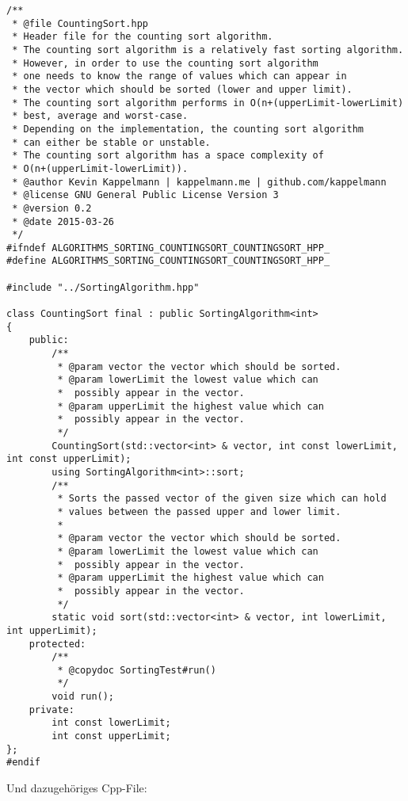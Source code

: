 \documentclass[12pt]{article}
\begin{document}
\begin{lstlisting}
/**
 * @file CountingSort.hpp
 * Header file for the counting sort algorithm.
 * The counting sort algorithm is a relatively fast sorting algorithm.
 * However, in order to use the counting sort algorithm
 * one needs to know the range of values which can appear in 
 * the vector which should be sorted (lower and upper limit).
 * The counting sort algorithm performs in O(n+(upperLimit-lowerLimit) 
 * best, average and worst-case.
 * Depending on the implementation, the counting sort algorithm 
 * can either be stable or unstable.
 * The counting sort algorithm has a space complexity of 
 * O(n+(upperLimit-lowerLimit)).
 * @author Kevin Kappelmann | kappelmann.me | github.com/kappelmann
 * @license GNU General Public License Version 3
 * @version 0.2
 * @date 2015-03-26
 */
#ifndef ALGORITHMS_SORTING_COUNTINGSORT_COUNTINGSORT_HPP_
#define ALGORITHMS_SORTING_COUNTINGSORT_COUNTINGSORT_HPP_

#include "../SortingAlgorithm.hpp"

class CountingSort final : public SortingAlgorithm<int>
{
	public:
		/**
		 * @param vector the vector which should be sorted.
		 * @param lowerLimit the lowest value which can 
		 * 	possibly appear in the vector.
		 * @param upperLimit the highest value which can 
		 *	possibly appear in the vector. 
		 */
		CountingSort(std::vector<int> & vector, int const lowerLimit, int const upperLimit);
		using SortingAlgorithm<int>::sort;
		/**
		 * Sorts the passed vector of the given size which can hold 
		 * values between the passed upper and lower limit.
		 *
		 * @param vector the vector which should be sorted.
		 * @param lowerLimit the lowest value which can 
		 *	possibly appear in the vector.
		 * @param upperLimit the highest value which can 
		 * 	possibly appear in the vector. 
		 */
		static void sort(std::vector<int> & vector, int lowerLimit, int upperLimit);
	protected:
		/**
		 * @copydoc SortingTest#run()
		 */
		void run();
	private:
		int const lowerLimit;
		int const upperLimit;
};
#endif
\end{lstlisting}
Und dazugehöriges Cpp-File:
\end{document}
